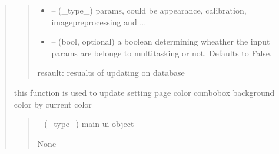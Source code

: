 \documentclass[letterpaper,10pt,english]{sphinxmanual}
\begin{document}
\begin{quote}
\begin{savenotes}
\begin{fulllineitems}
\begin{quote}
\begin{description}
\begin{itemize}
\item {} 
\sphinxAtStartPar
{} – (\_type\_) params, could be appearance, calibration, image\sphinxhyphen{}preprocessing and …

\item {} 
\sphinxAtStartPar
{} – (bool, optional) a boolean determining wheather the input params are belonge to multitasking or not. Defaults to False.

\end{itemize}

\sphinxAtStartPar
resault: resualts of updating on database

\end{description}\end{quote}

\end{fulllineitems}\end{savenotes}


\begin{savenotes}\begin{fulllineitems}
\label{\detokenize{setting/backend/mainsetting_funcs:oxin.backend.mainsetting_funcs.update_combo_color}}
\pysigstartsignatures
{}
\pysigstopsignatures
\sphinxAtStartPar
this function is used to update setting page color combobox background color by current color
\begin{quote}\begin{description}
\sphinxAtStartPar
{} – (\_type\_) main ui object

\sphinxAtStartPar
None

\end{description}\end{quote}

\end{fulllineitems}\end{savenotes}



\end{quote}
\end{document}
